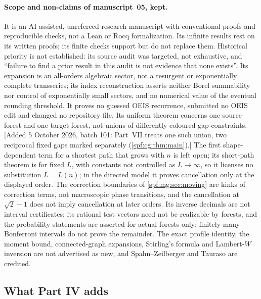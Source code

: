 \documentclass[11pt]{article}
\numberwithin{equation}{section}
\theoremstyle{definition}
\theoremstyle{remark}
\theoremstyle{definition}
\begin{document}
\paragraph{Scope and non-claims of manuscript~05, kept.}
It is an AI-assisted, unrefereed research manuscript with conventional
proofs and reproducible checks, not a Lean or Rocq formalization. Its
infinite results rest on its written proofs; its finite checks support but
do not replace them. Historical priority is not established: its source
audit was targeted, not exhaustive, and ``failure to find a prior result in
this audit is not evidence that none exists''. Its expansion is an all-orders
algebraic sector, not a resurgent or exponentially complete transseries; its
index reconstruction asserts neither Borel summability nor control of
exponentially small sectors, and no numerical value of the eventual rounding
threshold. It proves no guessed OEIS recurrence, submitted no OEIS edit and
changed no repository file. Its uniform theorem concerns one source forest
and one target forest, not unions of differently coloured gap constraints.
[Added 5 October 2026, batch 101: Part~VII treats one such union, two
reciprocal fixed gaps marked separately (\cref{spf:cg:thm:main}).]
The first shape-dependent term for a shortest path that grows with $n$ is
left open; its short-path theorem is for fixed $L$, with constants not
controlled as $L\to\infty$, so it licenses no substitution $L=L(n)$; in the
directed model it proves cancellation only at the displayed order. The
correction boundaries of \cref{spf:mg:sec:moving} are kinks of correction
terms, not macroscopic phase transitions, and the cancellation at
$\sqrt2-1$ does not imply cancellation at later orders. Its inverse decimals
are not interval certificates; its rational test vectors need not be
realizable by forests, and the probability statements are asserted for actual
forests only; finitely many Bonferroni intervals do not prove the remainder.
The exact profile identity, the moment bound, connected-graph expansions,
Stirling's formula and Lambert-$W$ inversion are not advertised as new, and
Spahn--Zeilberger and Tauraso are credited.

\subsection{What Part IV adds}
\label{spf:mg:sec:claims}
\end{document}
